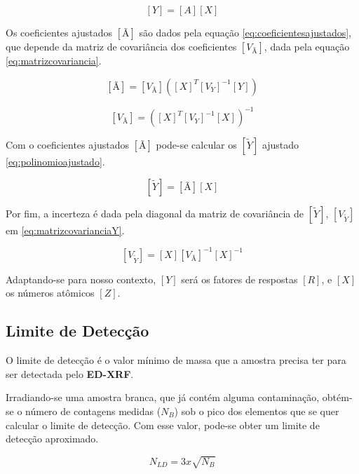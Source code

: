 \begin{equation}
  \label{eq:polinomioMatriz}
  [Y] = [A][X]
\end{equation}

Os coeficientes ajustados $[Ã]$ são dados pela equação \ref{eq:coeficientesajustados},
que depende da matriz de covariância dos coeficientes $[V_{Ã}]$, 
dada pela equação \ref{eq:matrizcovariancia}.

\begin{equation}
  \label{eq:coeficientesajustados}
  [Ã] = [V_{Ã}] ([X]^T {[V_Y]}^{-1} [Y])
\end{equation}

\begin{equation}
  \label{eq:matrizcovariancia}
  [V_{Ã}] = ([X]^T [V_Y]^{-1} [X])^{-1}
\end{equation}

Com o coeficientes ajustados $[Ã]$ pode-se calcular os 
$[\tilde{Y}]$ ajustado \ref{eq:polinomioajustado}.

\begin{equation}
  \label{eq:polinomioajustado}
  [\tilde{Y}] = [Ã][X]
\end{equation}

Por fim, a incerteza é dada pela diagonal da matriz de covariância 
de $[\tilde{Y}]$, $[V_{\tilde{Y}}]$ em \ref{eq:matrizcovarianciaY}.

\begin{equation}
  \label{eq:matrizcovarianciaY}
  [V_{\tilde{Y}}] = [X] [V_{Ã}]^{-1} [X]^{-1}
\end{equation}

Adaptando-se para nosso contexto, $[Y]$ será os fatores de respostas $[R]$,
e $[X]$ os números atômicos $[Z]$.

\subsection{Limite de Detecção}

O limite de detecção é o valor mínimo de massa que a amostra precisa
ter para ser detectada pelo \textbf{ED-XRF}. 

Irradiando-se uma amostra branca, que já contém alguma contaminação,
obtém-se o número de contagens medidas ($N_B$) sob o pico dos elementos que se
quer calcular o limite de detecção. Com esse valor, pode-se obter um 
limite de detecção aproximado. 

\begin{equation}
  \label{eq:limitedeteccao}
  N_{LD} = 3 x \sqrt{N_B}
\end{equation}

